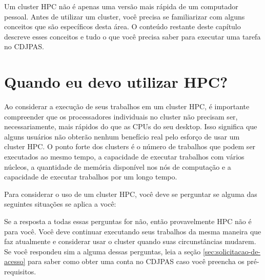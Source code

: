 Um cluster HPC não é apenas uma versão mais rápida de um computador pessoal. Antes de utilizar um cluster, você precisa se familiarizar com alguns conceitos que são específicos desta área. O conteúdo restante deste capítulo descreve esses conceitos e tudo o que você precisa saber para executar uma tarefa no CDJPAS.



\section{Quando eu devo utilizar HPC?}
\label{sec:quando-eu-devo-utilizar-hpc}


Ao considerar a execução de seus trabalhos em um cluster HPC, é importante compreender que os processadores individuais no cluster não precisam ser, necessariamente, mais rápidos do que as CPUs do seu desktop. Isso significa que alguns usuários não obterão nenhum benefício real pelo esforço de usar um cluster HPC. O ponto forte dos clusters é o número de trabalhos que podem ser executados ao mesmo tempo, a capacidade de executar trabalhos com vários núcleos, a quantidade de memória disponível nos nós de computação e a capacidade de executar trabalhos por um longo tempo.

Para considerar o uso de um cluster HPC, você deve se perguntar se alguma das seguintes situações se aplica a você:


Se a resposta a todas essas perguntas for não, então provavelmente HPC não é para você. Você deve continuar executando seus trabalhos da mesma maneira que faz atualmente e considerar usar o cluster quando suas circunstâncias mudarem. Se você respondeu sim a alguma dessas perguntas, leia a seção \ref{sec:solicitacao-de-acesso} para saber como obter uma conta no CDJPAS caso você preencha os pré-requisitos.



